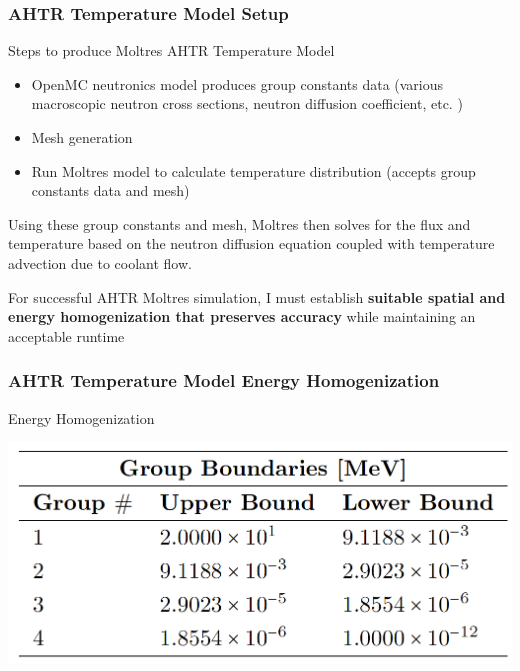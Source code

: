 \begin{frame}
    \frametitle{AHTR Temperature Model Setup}
    \begin{block}{Steps to produce Moltres AHTR Temperature Model}
        \begin{itemize}
          \item OpenMC neutronics model produces group constants data (various macroscopic 
          neutron cross sections, neutron diffusion coefficient, etc. )
          \item Mesh generation
          \item Run Moltres model to calculate temperature distribution 
          (accepts group constants data and mesh)
        \end{itemize}
    \end{block}
    Using these group constants and mesh, Moltres then solves for the flux and temperature 
    based on the neutron diffusion equation coupled with temperature advection due to coolant flow.
    
    \vspace{0.3cm}
    For successful AHTR Moltres simulation, I must establish \textbf{suitable spatial and
    energy homogenization that preserves accuracy} while maintaining an acceptable
    runtime
\end{frame}

\begin{frame}
    \frametitle{AHTR Temperature Model Energy Homogenization}
        \begin{block}{Energy Homogenization}
            \begin{table}[]
                \centering
                \begin{minipage}[c]{0.6\textwidth}
                    \centering
                    \includegraphics[width=0.8\linewidth]{figures/ahtr-energy-discr.png}
                \end{minipage}\hfill
                \begin{minipage}[c]{0.4\textwidth}
                \caption{4-group energy structures for AHTR geometry 
                derived by \cite{gentry_development_2016}.}
            \end{minipage}
            \end{table}
        \end{block}
\end{frame}

